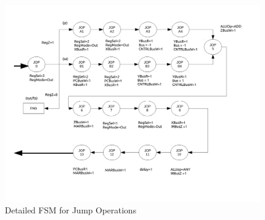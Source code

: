 \documentclass[conference]{IEEEtran}
\begin{document}
\begin{figure}[!t]
\centering
\includegraphics[width=\textwidth]{ControlFSMp5.pdf}
\caption{Detailed FSM for Jump Operations}
\label{fig_sim}
\end{figure}
\end{document}
